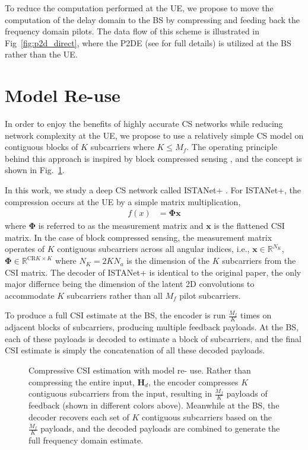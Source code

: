 To reduce the computation performed at the UE, we propose to move the computation of 
the delay domain to the BS by compressing and feeding back the frequency domain pilots.
The data flow of this scheme is illustrated in Fig~\ref{fig:p2d_direct}, where the 
P2DE (see \cite{ref:delRosario2022p2d} for full details) is utilized at the 
BS rather than the UE.

\section{Model Re-use} \label{sect:model_reuse}

In order to enjoy the benefits of highly accurate CS networks while
reducing network complexity at the UE, we propose to use a relatively simple CS
model on contiguous blocks of $K$ subcarriers where $K \leq M_f$.
The operating principle behind this approach is inspired by block 
compressed sensing \cite{ref:Gan2007blockCS}, and the concept is 
shown in Fig.~\ref{fig:model_reuse}.

In this work, we study a deep CS network called ISTANet+ \cite{ref:zhang2018ista}.
For ISTANet+, the compression occurs at the UE by a simple matrix multiplication, 
\begin{align}
    f(x) &= \mathbf{\Phi}\mathbf{x}
\end{align}
where $\mathbf{\Phi}$ is referred to as the measurement matrix and 
$\mathbf{x}$ is the flattened CSI matrix. In the case of block compressed
sensing, the measurement matrix operates of $K$ contiguous subcarriers across
all angular indices, i.e., $\mathbf{x} \in \mathbb{R}^{N_K}$, $\mathbf{\Phi} 
\in \mathbb{R}^{\text{CR} K  \times K}$ where $N_K = 2 K N_a$ is the dimension of
the $K$ subcarriers from the CSI matrix. The decoder of ISTANet+ is identical 
to the original paper, the only major differnce being the dimension of the latent
2D convolutions to accommodate $K$ subcarriers rather than all $M_f$ pilot subcarriers.

To produce a full CSI estimate at the BS, the encoder is run $\frac{M_f}{K}$ times
on adjacent blocks of subcarriers, producing multiple feedback payloads. At the BS, 
each of these payloads is decoded to estimate a block of subcarriers, and the final CSI
estimate is simply the concatenation of all these decoded payloads.

\begin{figure}
    \centering
    {
      \fontsize{8pt}{8pt}
      \def\svgwidth{1.0\linewidth}
      
    }
    \caption{Compressive CSI estimation with model re-
    use. Rather than compressing the entire input, $\mathbf{H}_d$,
    the encoder compresses $K$ contiguous subcarriers
    from the input, resulting in $\frac{M_f}{K}$ payloads of feedback
    (shown in different colors above). Meanwhile at the
    BS, the decoder recovers each set of $K$ contiguous
    subcarriers based on the $\frac{M_f}{K}$ payloads, and the
    decoded payloads are combined to generate the full
    frequency domain estimate.}
    \label{fig:model_reuse}
\end{figure}

